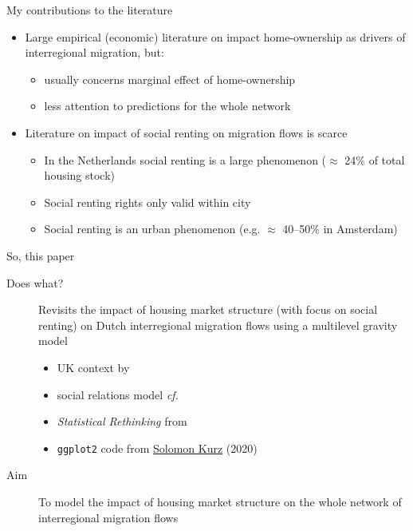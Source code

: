 \documentclass{beamer}
\begin{document}
\begin{frame}{My contributions to the literature}
  \begin{itemize}
  \item Large empirical (economic) literature on impact home-ownership as drivers of interregional migration, but:
    \begin{itemize}
    \item usually concerns \alert{marginal} effect of home-ownership
    \item less attention to \alert{predictions} for the whole network\newline
    \end{itemize}
  \item Literature on impact of social renting on migration flows is
    scarce \footnotesize{\citep{de2009homeownership} }
	\begin{itemize}
        \item In the Netherlands social renting is a large phenomenon
          ($\approx$ 24\% of total housing stock)
        \item Social renting rights only valid \alert{within} city
        \item Social renting is an \alert{urban} phenomenon (e.g. $\approx$
          40--50\% in Amsterdam) 
        \end{itemize}
\end{itemize}
\end{frame}

\begin{frame}{So, this paper}
  \begin{description}
  \item[Does what?] \alert{Revisits} the impact of housing market
    structure (with focus on social renting) on Dutch interregional
    migration flows using a \alert{multilevel} gravity model
    \begin{footnotesize}
	\begin{itemize}
	  \item \footnotesize UK context by \citet{congdon2010random}
	  \item \footnotesize social relations model \emph{cf.}
		\citet{koster2014food}
		\item \footnotesize \emph{Statistical Rethinking} from \citet{mcelreath2020statistical}
		\item \footnotesize \texttt{ggplot2} code from \href{https://bookdown.org/content/4857/}{Solomon Kurz} (2020) \newline
	\end{itemize}
  \end{footnotesize}
	\item[Aim] To \alert{model} the impact of housing market structure on the whole \alert{network} of interregional migration flows
  \end{description}
\end{frame}
\end{document}
